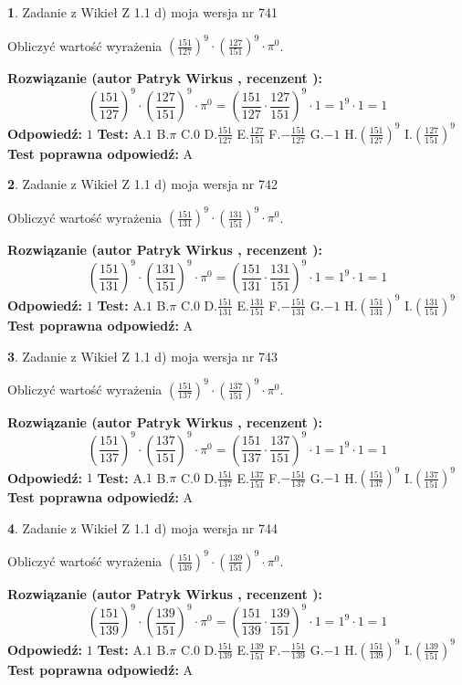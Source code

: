 \documentclass[12pt, a4paper]{article}
\theoremstyle{definition} %
\newtheorem{zad}{}
\newcommand{\zadStart}[1]{\begin{zad}#1\newline}
\newcommand{\zadStop}{\end{zad}}
\newcommand{\rozwStart}[2]{\noindent \textbf{Rozwiązanie (autor #1 , recenzent #2): }\newline}
\newcommand{\rozwStop}{\newline}
\newcommand{\odpStart}{\noindent \textbf{Odpowiedź:}\newline}
\newcommand{\odpStop}{\newline}
\newcommand{\testStart}{\noindent \textbf{Test:}\newline}
\newcommand{\testStop}{\newline}
\newcommand{\kluczStart}{\noindent \textbf{Test poprawna odpowiedź:}\newline}
\newcommand{\kluczStop}{\newline}
\begin{document}
\zadStart{Zadanie z Wikieł Z 1.1 d) moja wersja nr 741}

Obliczyć wartość wyrażenia $(\frac{151}{127})^{9} \cdot (\frac{127}{151})^{9} \cdot \pi^{0}$.
\zadStop
\rozwStart{Patryk Wirkus}{}
$$(\frac{151}{127})^{9} \cdot (\frac{127}{151})^{9} \cdot \pi^{0} = (\frac{151}{127} \cdot \frac{127}{151})^{9} \cdot 1 = 1^{9} \cdot 1 = 1$$
\rozwStop
\odpStart
$1$
\odpStop
\testStart
A.$1$ B.$\pi$ C.$0$ D.$\frac{151}{127}$ E.$\frac{127}{151}$
F.$-\frac{151}{127}$ G.$-1$
H.$(\frac{151}{127})^{9}$
I.$(\frac{127}{151})^{9}$
\testStop
\kluczStart
A
\kluczStop



\zadStart{Zadanie z Wikieł Z 1.1 d) moja wersja nr 742}

Obliczyć wartość wyrażenia $(\frac{151}{131})^{9} \cdot (\frac{131}{151})^{9} \cdot \pi^{0}$.
\zadStop
\rozwStart{Patryk Wirkus}{}
$$(\frac{151}{131})^{9} \cdot (\frac{131}{151})^{9} \cdot \pi^{0} = (\frac{151}{131} \cdot \frac{131}{151})^{9} \cdot 1 = 1^{9} \cdot 1 = 1$$
\rozwStop
\odpStart
$1$
\odpStop
\testStart
A.$1$ B.$\pi$ C.$0$ D.$\frac{151}{131}$ E.$\frac{131}{151}$
F.$-\frac{151}{131}$ G.$-1$
H.$(\frac{151}{131})^{9}$
I.$(\frac{131}{151})^{9}$
\testStop
\kluczStart
A
\kluczStop



\zadStart{Zadanie z Wikieł Z 1.1 d) moja wersja nr 743}

Obliczyć wartość wyrażenia $(\frac{151}{137})^{9} \cdot (\frac{137}{151})^{9} \cdot \pi^{0}$.
\zadStop
\rozwStart{Patryk Wirkus}{}
$$(\frac{151}{137})^{9} \cdot (\frac{137}{151})^{9} \cdot \pi^{0} = (\frac{151}{137} \cdot \frac{137}{151})^{9} \cdot 1 = 1^{9} \cdot 1 = 1$$
\rozwStop
\odpStart
$1$
\odpStop
\testStart
A.$1$ B.$\pi$ C.$0$ D.$\frac{151}{137}$ E.$\frac{137}{151}$
F.$-\frac{151}{137}$ G.$-1$
H.$(\frac{151}{137})^{9}$
I.$(\frac{137}{151})^{9}$
\testStop
\kluczStart
A
\kluczStop



\zadStart{Zadanie z Wikieł Z 1.1 d) moja wersja nr 744}

Obliczyć wartość wyrażenia $(\frac{151}{139})^{9} \cdot (\frac{139}{151})^{9} \cdot \pi^{0}$.
\zadStop
\rozwStart{Patryk Wirkus}{}
$$(\frac{151}{139})^{9} \cdot (\frac{139}{151})^{9} \cdot \pi^{0} = (\frac{151}{139} \cdot \frac{139}{151})^{9} \cdot 1 = 1^{9} \cdot 1 = 1$$
\rozwStop
\odpStart
$1$
\odpStop
\testStart
A.$1$ B.$\pi$ C.$0$ D.$\frac{151}{139}$ E.$\frac{139}{151}$
F.$-\frac{151}{139}$ G.$-1$
H.$(\frac{151}{139})^{9}$
I.$(\frac{139}{151})^{9}$
\testStop
\kluczStart
A
\kluczStop
\end{document}
